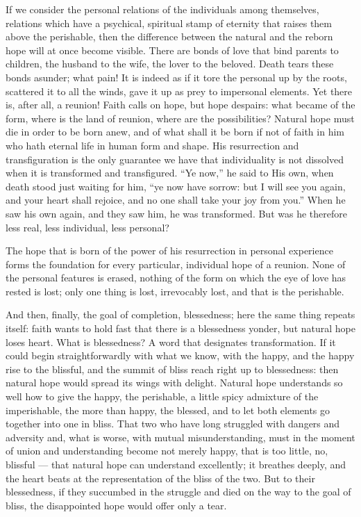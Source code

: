 \documentclass[12pt,a4paper,openany]{book}
\newcommand{\opage}[1]{\marginnote{\footnotesize\textit{[#1]}}}
\begin{document}
If we consider the personal relations of the individuals among themselves, relations which have a psychical, spiritual
stamp of eternity that raises them above the perishable, then the difference between the natural and the reborn hope
will at once become visible. There are bonds of love that bind parents to children, the husband to the wife, the lover
to the beloved. Death tears these bonds asunder; what pain! It is indeed as if it tore the personal up by the roots,
scattered it to all the winds, gave it up as prey to impersonal elements. Yet there is, after all, a reunion! Faith
calls on hope, but hope despairs: what became of the form, where is the land of reunion, where are the possibilities?
Natural hope must die in order to be born anew, and of what shall it be born if not of faith in him who hath eternal
life in human form and shape. His resurrection and transfiguration is the only guarantee we have that individuality is
not dissolved when it is transformed and transfigured. ``Ye now,'' he said to His own, when death stood just waiting
for him, ``ye now have sorrow: but I will see you again, and your heart shall rejoice, and no one shall take your joy
from you.'' When he saw his own again, and they saw him, he was transformed. But was he therefore less real, less
individual, less personal?

The hope that is born of the power of his resurrection in personal experience forms the foundation for every
particular, individual hope of a reunion. None of the
\setcounter{footnote}{0}%
\opage{99}personal features is erased, nothing of the form on which the eye of love has rested is lost; only one thing
is lost, irrevocably lost, and that is the perishable.

And then, finally, the goal of completion, blessedness; here the same thing repeats itself: faith wants to hold fast
that there is a blessedness yonder, but natural hope loses heart. What is blessedness? A word that designates
transformation. If it could begin straightforwardly with what we know, with the happy, and the happy rise to the
blissful, and the summit of bliss reach right up to blessedness: then natural hope would spread its wings with
delight. Natural hope understands so well how to give the happy, the perishable, a little spicy admixture of the
imperishable, the more than happy, the blessed, and to let both elements go together into one in bliss. That two who
have long struggled with dangers and adversity and, what is worse, with mutual misunderstanding, must in the moment of
union and understanding become not merely happy, that is too little, no, blissful --- that natural hope can understand
excellently; it breathes deeply, and the heart beats at the representation of the bliss of the two. But to their
blessedness, if they succumbed in the struggle and died on the way to the goal of bliss, the disappointed hope would
offer only a tear.
\end{document}
